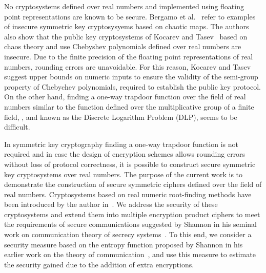 \documentclass[10pt,journal]{IEEEtran}
\begin{document}
No cryptosystems defined over real numbers and implemented 
using floating point representations are known to be secure. Bergamo et al.~\cite{bergamo-2005} refer to examples of insecure symmetric key 
cryptosysyems based on chaotic maps. The authors also show that the 
public key cryptosystems of Kocarev and Tasev~\cite{kocarev-2003} 
based on chaos theory and use Chebyshev polynomials defined over 
real numbers are insecure. Due to the finite 
precision of the floating point representations of real numbers, rounding 
errors are unavoidable. For this reason, Kocarev and Tasev suggest upper 
bounds on numeric inputs to ensure the validity of 
the semi-group property of Chebychev polynomials, required to establish 
the public key protocol. On the other hand, finding a one-way trapdoor 
function over the field of real numbers similar to the function 
defined over the multiplicative group of a finite field, , 
and known as the Discrete Logarithm Problem (DLP), seems to be difficult.
\newline

In symmetric key cryptography finding a one-way trapdoor function 
is not required and in case the design of encryption schemes allows 
rounding errors without loss of protocol correctness, it is possible
to construct secure symmetric key cryptosystems over real numbers. 
The purpose of the current work is to demonstrate the construction of
secure symmetric ciphers defined over the field of real numbers.
Cryptosystems based on real numeric root-finding methods have 
been introduced by the author in~\cite{hassoun-2014}. We address 
the security of these cryptosystems and extend them into 
multiple encryption product ciphers to meet the requirements of 
secure communications suggested by Shannon in his seminal work 
on communication theory of secrecy systems~\cite{shannon-1949}. 
To this end, we consider a security measure based on the entropy 
function proposed by Shannon in his earlier work on the theory of communication~\cite{shannon-1948}, and use this measure to 
estimate the security gained due to the addition of extra encryptions.
\newline
\end{document}
